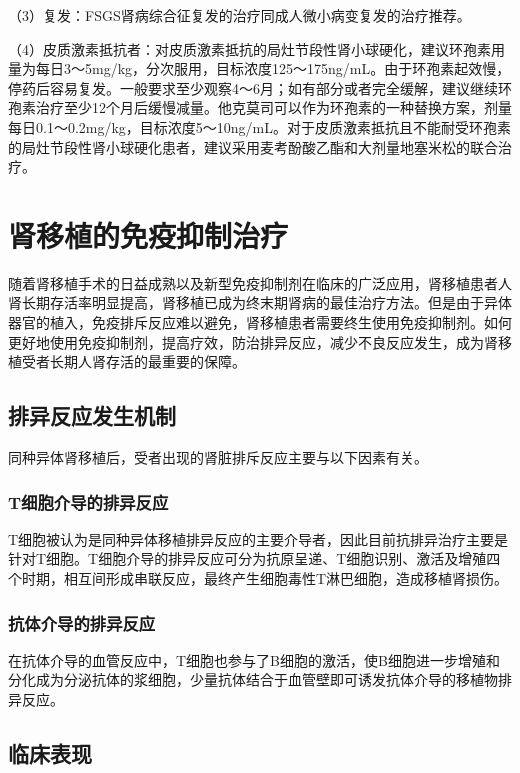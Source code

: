 （3）复发：FSGS肾病综合征复发的治疗同成人微小病变复发的治疗推荐。

（4）皮质激素抵抗者：对皮质激素抵抗的局灶节段性肾小球硬化，建议环孢素用量为每日3～5mg/kg，分次服用，目标浓度125～175ng/mL。由于环孢素起效慢，停药后容易复发。一般要求至少观察4～6月；如有部分或者完全缓解，建议继续环孢素治疗至少12个月后缓慢减量。他克莫司可以作为环孢素的一种替换方案，剂量每日0.1～0.2mg/kg，目标浓度5～10ng/mL。对于皮质激素抵抗且不能耐受环孢素的局灶节段性肾小球硬化患者，建议采用麦考酚酸乙酯和大剂量地塞米松的联合治疗。

\section{肾移植的免疫抑制治疗}

随着肾移植手术的日益成熟以及新型免疫抑制剂在临床的广泛应用，肾移植患者人肾长期存活率明显提高，肾移植已成为终末期肾病的最佳治疗方法。但是由于异体器官的植入，免疫排斥反应难以避免，肾移植患者需要终生使用免疫抑制剂。如何更好地使用免疫抑制剂，提高疗效，防治排异反应，减少不良反应发生，成为肾移植受者长期人肾存活的最重要的保障。

\subsection{排异反应发生机制}

同种异体肾移植后，受者出现的肾脏排斥反应主要与以下因素有关。

\subsubsection{T细胞介导的排异反应}

T细胞被认为是同种异体移植排异反应的主要介导者，因此目前抗排异治疗主要是针对T细胞。T细胞介导的排异反应可分为抗原呈递、T细胞识别、激活及增殖四个时期，相互间形成串联反应，最终产生细胞毒性T淋巴细胞，造成移植肾损伤。

\subsubsection{抗体介导的排异反应}

在抗体介导的血管反应中，T细胞也参与了B细胞的激活，使B细胞进一步增殖和分化成为分泌抗体的浆细胞，少量抗体结合于血管壁即可诱发抗体介导的移植物排异反应。

\subsection{临床表现}

